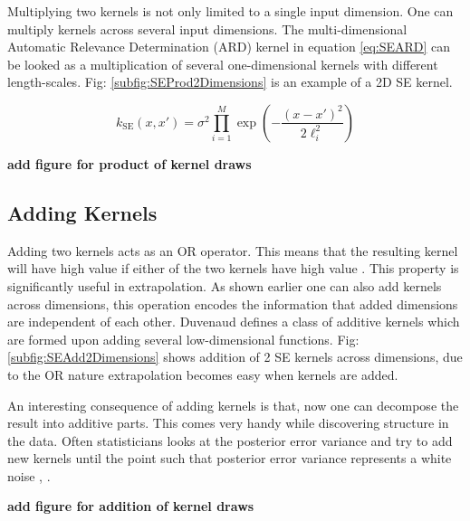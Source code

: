 Multiplying two kernels is not only limited to a single input dimension. One can multiply kernels across several input dimensions. The multi-dimensional Automatic Relevance Determination (ARD) kernel in equation \ref{eq:SEARD} can be looked as a multiplication of several one-dimensional kernels with different length-scales. Fig: \ref{subfig:SEProd2Dimensions} is an example of a 2D SE kernel.

\begin{equation}\label{eq:SEARD}
k_{\textrm{SE}}(x, x') = \sigma^2\prod_{i=1}^{M}\exp\left(-\frac{(x - x')^2}{2\ell_{i}^2}\right)
\end{equation}

\textbf{add figure for product of kernel draws}


\subsection{Adding Kernels} \label{subsec:structureKernelsAddingKernels}
Adding two kernels acts as an OR operator. This means that the resulting kernel will have high value if either of the two kernels have high value \cite{durrande2011additive}. This property is significantly useful in extrapolation. As shown earlier one can also add kernels across dimensions, this operation encodes the information that added dimensions are independent of each other. Duvenaud \cite{duvenaud2011additive} defines a class of additive kernels which are formed upon adding several low-dimensional functions. Fig: \ref{subfig:SEAdd2Dimensions} shows addition of 2 SE kernels across dimensions, due to the OR nature extrapolation becomes easy when kernels are added.

An interesting consequence of adding kernels is that, now one can decompose the result into additive parts. This comes very handy while discovering structure in the data. Often statisticians  looks at the posterior error variance and try to add new kernels until the point such that posterior error variance represents a white noise \cite{duvenaud2013structure}, \cite{lloyd2014automatic}. 

\textbf{add figure for addition of kernel draws}




